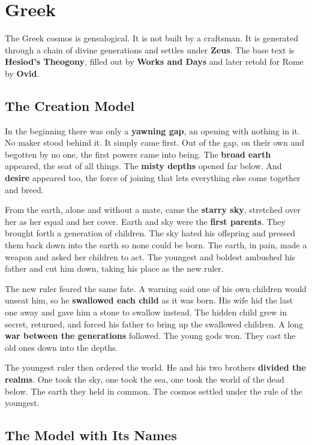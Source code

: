\section{Greek}

The Greek cosmos is genealogical. It is not built by a craftsman. It is
generated through a chain of divine generations and settles under \textbf{Zeus}.
The base text is \textbf{Hesiod's Theogony}, filled out by \textbf{Works and
Days} and later retold for Rome by \textbf{Ovid}.

\subsection{The Creation Model}

In the beginning there was only a \textbf{yawning gap}, an opening with nothing
in it. No maker stood behind it. It simply came first. Out of the gap, on their
own and begotten by no one, the first powers came into being. The \textbf{broad
earth} appeared, the seat of all things. The \textbf{misty depths} opened far
below. And \textbf{desire} appeared too, the force of joining that lets
everything else come together and breed.

From the earth, alone and without a mate, came the \textbf{starry sky},
stretched over her as her equal and her cover. Earth and sky were the
\textbf{first parents}. They brought forth a generation of children. The sky
hated his offspring and pressed them back down into the earth so none could be
born. The earth, in pain, made a weapon and asked her children to act. The
youngest and boldest ambushed his father and cut him down, taking his place as
the new ruler.

The new ruler feared the same fate. A warning said one of his own children would
unseat him, so he \textbf{swallowed each child} as it was born. His wife hid the
last one away and gave him a stone to swallow instead. The hidden child grew in
secret, returned, and forced his father to bring up the swallowed children. A
long \textbf{war between the generations} followed. The young gods won. They
cast the old ones down into the depths.

The youngest ruler then ordered the world. He and his two brothers
\textbf{divided the realms}. One took the sky, one took the sea, one took the
world of the dead below. The earth they held in common. The cosmos settled under
the rule of the youngest.

\subsection{The Model with Its Names}

